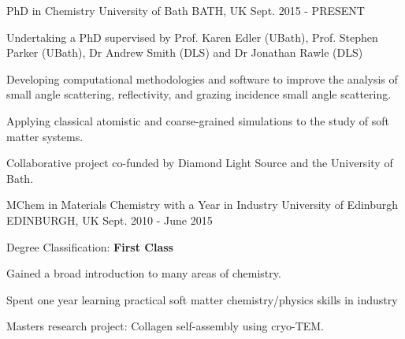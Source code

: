 \begin{cventries}
  \cventry
    {PhD in Chemistry}
    {University of Bath}
    {BATH, UK}
    {Sept. 2015 - PRESENT}
    {
      \begin{cvitems}
        \item {Undertaking a PhD supervised by Prof. Karen Edler (UBath), Prof. Stephen Parker (UBath), Dr Andrew Smith (DLS) and Dr Jonathan Rawle (DLS)}
        \item {Developing computational methodologies and software to improve the analysis of small angle scattering, reflectivity, and grazing incidence small angle scattering.}
        \item {Applying classical atomistic and coarse-grained simulations to the study of soft matter systems.}
        \item {Collaborative project co-funded by Diamond Light Source and the University of Bath.}
      \end{cvitems}
    }
  \cventry
    {MChem in Materials Chemistry with a Year in Industry}
    {University of Edinburgh}
    {EDINBURGH, UK}
    {Sept. 2010 - June 2015}
    {
      \begin{cvitems}
        \item {Degree Classification: \textbf{First Class}}
        \item {Gained a broad introduction to many areas of chemistry.}
        \item {Spent one year learning practical soft matter chemistry/physics skills in industry}
        \item {Masters research project: Collagen self-assembly using cryo-TEM.}
      \end{cvitems}
    }
\end{cventries}

